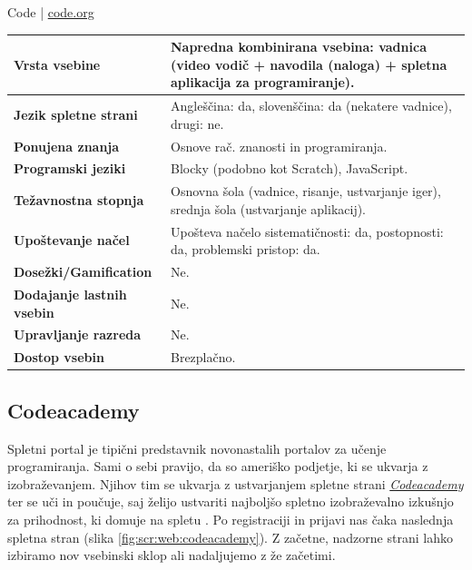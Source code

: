 \begin{osebnabox}[label={osebna:code.org}]{Code | \url{code.org}}
    \begin{tabular}{
  p{} |
  p{}  }
  \textbf{Vrsta vsebine} & Napredna kombinirana vsebina: vadnica
                           (video vodič + navodila (naloga) + spletna
                           aplikacija za programiranje). \\
      \hline 
  \textbf{Jezik spletne strani} &  Angleščina: da, slovenščina: da
                                  (nekatere vadnice),
                                  drugi: ne. \\
      \hline
  \textbf{Ponujena znanja} & Osnove rač. znanosti in programiranja. \\
      \hline
  \textbf{Programski jeziki} & Blocky (podobno kot Scratch),
                               JavaScript. \\
      \hline
  \textbf{Težavnostna stopnja} & Osnovna šola (vadnice, risanje,
                                 ustvarjanje iger), srednja šola
                                 (ustvarjanje aplikacij). \\
      \hline
  \textbf{Upoštevanje načel} & Upošteva načelo sistematičnosti: da,
      postopnosti: da, problemski pristop: da. \\
      \hline
  \textbf{Dosežki/Gamification} & Ne. \\
      \hline
  \textbf{Dodajanje lastnih vsebin} & Ne. \\
      \hline
  \textbf{Upravljanje razreda} & Ne. \\
      \hline
  \textbf{Dostop vsebin} & Brezplačno. \\
\end{tabular}
\end{osebnabox}
\subsection{Codeacademy}

Spletni portal je tipični predstavnik novonastalih portalov za učenje
programiranja. Sami o sebi pravijo, da so ameriško podjetje, ki se
ukvarja z izobraževanjem. Njihov tim se ukvarja z ustvarjanjem spletne strani
\emph{\href{https://www.codecademy.com/}{Codeacademy}} ter se uči in
poučuje, saj želijo ustvariti najboljšo spletno izobraževalno izkušnjo
za prihodnost, ki domuje na spletu \cite{web:codeacademy}. Po
registraciji in prijavi nas čaka naslednja spletna stran (slika
\ref{fig:scr:web:codeacademy}). Z začetne, nadzorne strani lahko
izbiramo nov vsebinski sklop ali nadaljujemo z že začetimi.

